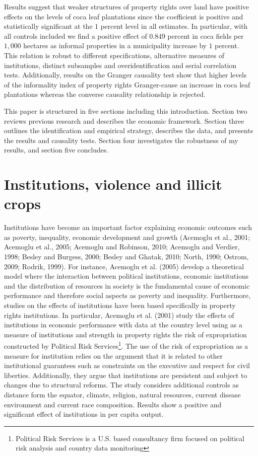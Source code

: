 \documentclass[12pt,a4paper,english]{article}%
\begin{document}
Results suggest that weaker structures of property rights over land have positive effects on the levels of coca leaf plantations since the coefficient is positive and statistically significant at the $1$ percent level in all estimates. In particular, with all controls included we find a positive effect of $0.849$ percent in coca fields per $1,000$ hectares as informal properties in a municipality increase by $1$ percent. This relation is robust to different specifications, alternative measures of institutions, distinct subsamples and overidentification and serial correlation tests. Additionally, results on the Granger causality test show that higher levels of the informality index of property rights Granger-cause an increase in coca leaf plantations whereas the converse causality relationship is rejected.

This paper is structured in five sections including this introduction. Section two reviews previous research and describes the economic framework. Section three outlines the identification and empirical strategy, describes the data, and presents the results and causality tests. Section four investigates the robustness of my results, and section five concludes.

\section{Institutions, violence and illicit crops}
\label{previous_res}

Institutions have become an important factor explaining economic outcomes such as poverty, inequality, economic development and growth (Acemoglu et al., 2001; Acemoglu et al., 2005; Acemoglu and Robinson, 2010; Acemoglu and Verdier, 1998; Besley and Burgess, 2000; Besley and Ghatak, 2010; North, 1990; Ostrom, 2009; Rodrik, 1999). For instance, Acemoglu et al. (2005) develop a theoretical model where the interaction between political institutions, economic institutions and the distribution of resources in society is the fundamental cause of economic performance and therefore social aspects as poverty and inequality. Furthermore, studies on the effects of institutions have been based specifically in property rights institutions. In particular, Acemoglu et al. (2001) study the effects of institutions in economic performance with data at the country level using as a measure of institutions and strength in property rights the risk of expropriation constructed by Political Risk Services\footnote{Political Risk Services is a U.S. based consultancy firm focused on political risk analysis and country data monitoring}. The use of the risk of expropriation as a measure for institution relies on the argument that it is related to other institutional guarantees such as constraints on the executive and respect for civil liberties. Additionally, they argue that institutions are persistent and subject to changes due to structural reforms. The study considers additional controls as distance form the equator, climate, religion, natural resources, current disease environment and current race composition. Results show a positive and significant effect of institutions in per capita output.
\end{document}
